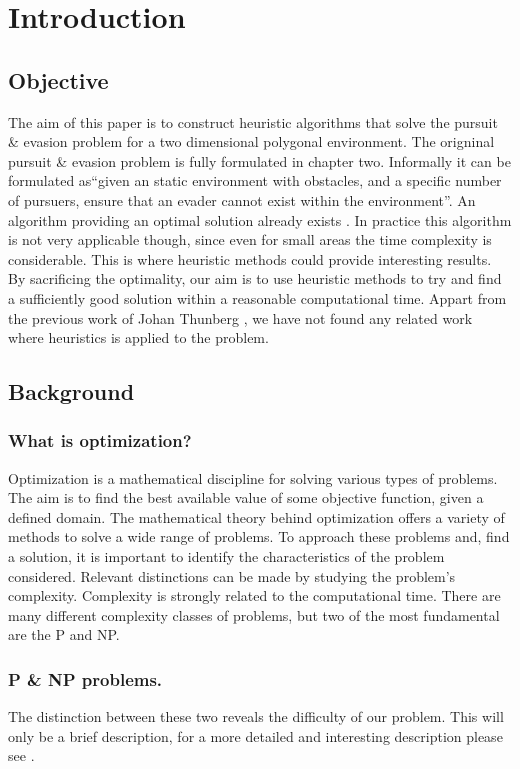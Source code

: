 \chapter{Introduction}

\section{Objective}

The aim of this paper is to construct heuristic algorithms that solve the  pursuit \& evasion problem for a two dimensional polygonal environment. The origninal pursuit \& evasion problem is fully formulated in chapter two. Informally it can be formulated as``given an static environment with obstacles, and a specific number of pursuers, ensure that an evader cannot exist within the environment''. An algorithm providing an optimal solution already exists \cite{paper2}. In practice this algorithm is not very applicable though, since even for small areas the time complexity is considerable. This is where heuristic methods could provide interesting results. By sacrificing the optimality, our aim is to use heuristic methods to try and find a sufficiently good solution within a reasonable computational time. Appart from the previous work of Johan Thunberg \cite{paper2}, we have not found any related work where heuristics is applied to the problem. 
\section{Background}

\subsection{What is optimization?}
Optimization is a mathematical discipline for solving various types of problems. The aim is to find the best available value of some objective function, given a defined domain.%
The mathematical theory behind optimization offers a variety of methods to solve a wide range of problems. To approach these problems and, find a solution, it is important to identify the characteristics of the problem considered. Relevant distinctions can be made by studying the problem's complexity. Complexity is strongly related to the computational time. There are many different complexity classes of problems, but two of the most fundamental are the P and NP.

\subsection{P \& NP problems.}
The distinction between these two reveals the difficulty of our problem. This will only be a brief description, for a more detailed and interesting description please see \cite{NP}.

